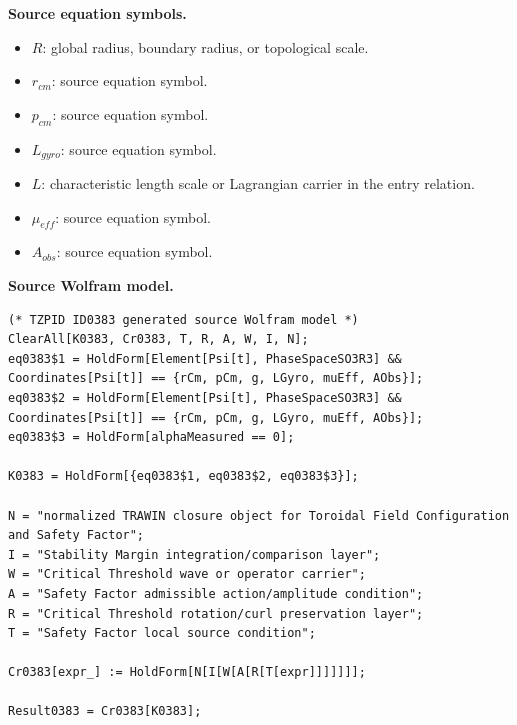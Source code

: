 \begin{minipage}[t]{0.49\linewidth}
\begingroup
\small
\raggedright
\textbf{Source equation symbols.}\par
\begin{itemize}[leftmargin=1.35em,itemsep=1pt,topsep=1pt,parsep=0pt]
    \item $R$: global radius, boundary radius, or topological scale.
    \item $r_{cm}$: source equation symbol.
    \item $p_{cm}$: source equation symbol.
    \item $L_{gyro}$: source equation symbol.
    \item $L$: characteristic length scale or Lagrangian carrier in the entry relation.
    \item $\mu_{eff}$: source equation symbol.
    \item $A_{obs}$: source equation symbol.
\end{itemize}
\endgroup
\end{minipage}\hfill
\begin{minipage}[t]{0.47\linewidth}
\begingroup
\scriptsize
\raggedright
\textbf{Source Wolfram model.}\par
\begin{Verbatim}[fontsize=\tiny,breaklines=true,breakanywhere=true]
(* TZPID ID0383 generated source Wolfram model *)
ClearAll[K0383, Cr0383, T, R, A, W, I, N];
eq0383$1 = HoldForm[Element[Psi[t], PhaseSpaceSO3R3] && Coordinates[Psi[t]] == {rCm, pCm, g, LGyro, muEff, AObs}];
eq0383$2 = HoldForm[Element[Psi[t], PhaseSpaceSO3R3] && Coordinates[Psi[t]] == {rCm, pCm, g, LGyro, muEff, AObs}];
eq0383$3 = HoldForm[alphaMeasured == 0];

K0383 = HoldForm[{eq0383$1, eq0383$2, eq0383$3}];

N = "normalized TRAWIN closure object for Toroidal Field Configuration and Safety Factor";
I = "Stability Margin integration/comparison layer";
W = "Critical Threshold wave or operator carrier";
A = "Safety Factor admissible action/amplitude condition";
R = "Critical Threshold rotation/curl preservation layer";
T = "Safety Factor local source condition";

Cr0383[expr_] := HoldForm[N[I[W[A[R[T[expr]]]]]]];

Result0383 = Cr0383[K0383];
\end{Verbatim}
\endgroup
\end{minipage}

